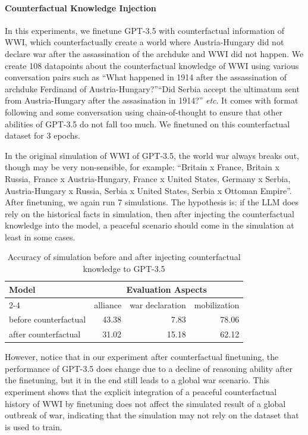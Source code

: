 \documentclass{article}
\begin{document}
\paragraph{Counterfactual Knowledge Injection} In this experiments, we finetune GPT-3.5 with counterfactual information of WWI, which counterfactually create a world where Austria-Hungary did not declare war after the assassination of the archduke and WWI did not happen. We create 108 datapoints about the counterfactual knowledge of WWI using various conversation pairs such as ``What happened in 1914 after the assassination of archduke Ferdinand of Austria-Hungary?''``Did Serbia accept the ultimatum sent from Austria-Hungary after the assasination in 1914?'' \emph{etc}. It comes with format following and some conversation using chain-of-thought to ensure that other abilities of GPT-3.5 do not fall too much. We finetuned on this counterfactual dataset for 3 epochs.

In the original simulation of WWI of GPT-3.5, the world war always breaks out, though may be very non-sensible, for example: ``Britain x France, Britain x Russia, France x Austria-Hungary, France x United States, Germany x Serbia, Austria-Hungary x Russia, Serbia x United States, Serbia x Ottoman Empire''. After finetuning, we again run 7 simulations. The hypothesis is: if the LLM does rely on the historical facts in simulation, then after injecting the counterfactual knowledge into the model, a peaceful scenario should come in the simulation at least in some cases.
\begin{table}[!ht]
    \centering
    \begin{tabular}{lrrr}
        \toprule
        \multirow{2}{*}{\bf Model} & \multicolumn{3}{c}{\bf Evaluation Aspects} \\
        \cmidrule(lr){2-4}
        & alliance  & war declaration  & mobilization  \\
        \midrule
        before counterfactual& 43.38 & 7.83 & 78.06 \\
        \midrule
        after counterfactual & 31.02 & 15.18 & 62.12 \\
        \bottomrule
    \end{tabular}
    \caption{Accuracy of simulation before and after injecting counterfactual knowledge to GPT-3.5}
    \label{tab:counterfactual}
\end{table}

However, notice that in our experiment after counterfactual finetuning, the performance of GPT-3.5 does change due to a decline of reasoning ability after the finetuning, but it in the end still leads to a global war scenario. This experiment shows that the explicit integration of a peaceful counterfactual history of WWI by finetuning does not affect the simulated result of a global outbreak of war, indicating that the simulation may not rely on the dataset that is used to train.
\end{document}
